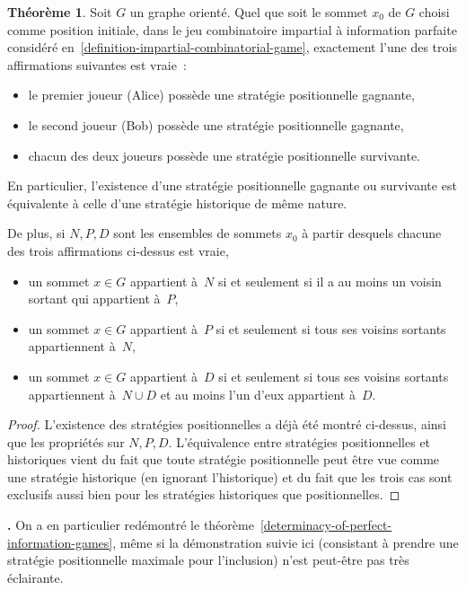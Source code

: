 \documentclass[12pt,a4paper]{article}
\theoremstyle{definition}
\newcommand\thingy{%
\refstepcounter{comcnt}\smallskip\noindent\textbf{\thecomcnt.} }
\newtheorem{thm}[comcnt]{Théorème}
\begin{document}
\begin{thm}\label{positional-determinacy-of-perfect-information-games}
Soit $G$ un graphe orienté.  Quel que soit le sommet $x_0$ de $G$
choisi comme position initiale, dans le jeu combinatoire impartial à
information parfaite considéré
en \ref{definition-impartial-combinatorial-game}, exactement
l'une des trois affirmations suivantes est vraie :
\begin{itemize}
\item le premier joueur (Alice) possède une stratégie positionnelle gagnante,
\item le second joueur (Bob) possède une stratégie positionnelle gagnante,
\item chacun des deux joueurs possède une stratégie positionnelle survivante.
\end{itemize}

En particulier, l'existence d'une stratégie positionnelle gagnante ou
survivante est équivalente à celle d'une stratégie historique de même
nature.

De plus, si $N,P,D$ sont les ensembles de sommets $x_0$ à partir
desquels chacune des trois affirmations ci-dessus est vraie,
\begin{itemize}
\item un sommet $x\in G$ appartient à $N$ si et seulement si il a
  au moins un voisin sortant qui appartient à $P$,
\item un sommet $x\in G$ appartient à $P$ si et seulement si tous
  ses voisins sortants appartiennent à $N$,
\item un sommet $x\in G$ appartient à $D$ si et seulement si tous ses
  voisins sortants appartiennent à $N\cup D$ et au moins l'un d'eux
  appartient à $D$.
\end{itemize}
\end{thm}
\begin{proof}
L'existence des stratégies positionnelles a déjà été montré ci-dessus,
ainsi que les propriétés sur $N,P,D$.  L'équivalence entre stratégies
positionnelles et historiques vient du fait que toute stratégie
positionnelle peut être vue comme une stratégie historique (en
ignorant l'historique) et du fait que les trois cas sont exclusifs
aussi bien pour les stratégies historiques que positionnelles.
\end{proof}

\thingy On a en particulier redémontré le
théorème \ref{determinacy-of-perfect-information-games}, même si la
démonstration suivie ici (consistant à prendre une stratégie
positionnelle maximale pour l'inclusion) n'est peut-être pas très
éclairante.
\end{document}
